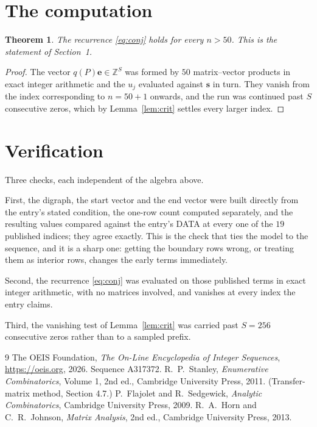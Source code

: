 \documentclass[11pt,a4paper]{article}
\theoremstyle{plain}
\newtheorem{theorem}{Theorem}
\theoremstyle{definition}
\begin{document}
\section{The computation}

\begin{theorem}
The recurrence \eqref{eq:conj} holds for every $n>50$. This is the statement of
Section~1.
\end{theorem}

\begin{proof}
The vector $q(P)\mathbf{e}\in\mathbb{Z}^{S}$ was formed by $50$ matrix--vector
products in exact integer arithmetic and the $u_j$ evaluated against $\mathbf{s}$ in turn.
They vanish from the index corresponding to $n=50+1$ onwards, and the run was continued
past $S$ consecutive zeros, which by Lemma~\ref{lem:crit} settles every larger index.
\end{proof}

\section{Verification}

Three checks, each independent of the algebra above.

First, the digraph, the start vector and the end vector were built directly from the
entry's stated condition, the one-row count computed separately, and the resulting values
compared against the entry's DATA at every one of the $19$ published indices; they
agree exactly. This is the check that ties the model to the sequence, and it is a sharp one:
getting the boundary rows wrong, or treating them as interior rows, changes the early terms
immediately.

Second, the recurrence \eqref{eq:conj} was evaluated on those published terms in exact
integer arithmetic, with no matrices involved, and vanishes at every index the entry claims.

Third, the vanishing test of Lemma~\ref{lem:crit} was carried past $S=256$ consecutive
zeros rather than to a sampled prefix.

\begin{thebibliography}{9}
 The OEIS Foundation, \emph{The On-Line Encyclopedia of Integer
Sequences}, \url{https://oeis.org}, 2026. Sequence A317372.
 R.~P.~Stanley, \emph{Enumerative Combinatorics}, Volume 1, 2nd ed.,
Cambridge University Press, 2011. (Transfer-matrix method, Section 4.7.)
 P.~Flajolet and R.~Sedgewick, \emph{Analytic Combinatorics}, Cambridge
University Press, 2009.
 R.~A.~Horn and C.~R.~Johnson, \emph{Matrix Analysis}, 2nd ed., Cambridge
University Press, 2013.
\end{thebibliography}
\end{document}
